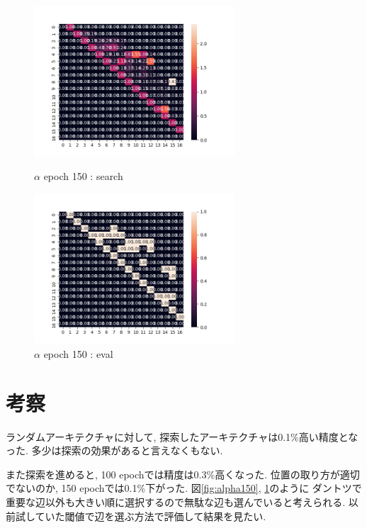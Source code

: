 \documentclass[twocolumn]{jarticle}     %
\begin{document}
\begin{figure}[tb]
 \begin{minipage}{0.5\hsize}
 	\begin{center}
 		\includegraphics[clip,width=75mm]{alpha_150.png}
 		\caption{$\alpha$ epoch 150 : search}
 		\label{fig:alpha150}
 	\end{center}
 \end{minipage}
 \begin{minipage}{0.5\hsize}
 	\begin{center}
 		\includegraphics[clip,width=75mm]{alpha_150e.png}
 		\caption{$\alpha$ epoch 150 : eval}
 		\label{fig:alpha150e}
 	\end{center}
 \end{minipage}
\end{figure}

\section{考察}
ランダムアーキテクチャに対して, 探索したアーキテクチャは0.1\%高い精度となった.
多少は探索の効果があると言えなくもない.

また探索を進めると, 100 epochでは精度は0.3\%高くなった.
位置の取り方が適切でないのか, 150 epochでは0.1\%下がった.
図\ref{fig:alpha150}, \ref{fig:alpha150e}のように
ダントツで重要な辺以外も大きい順に選択するので無駄な辺も選んでいると考えられる.
以前試していた閾値で辺を選ぶ方法で評価して結果を見たい.
\end{document}
